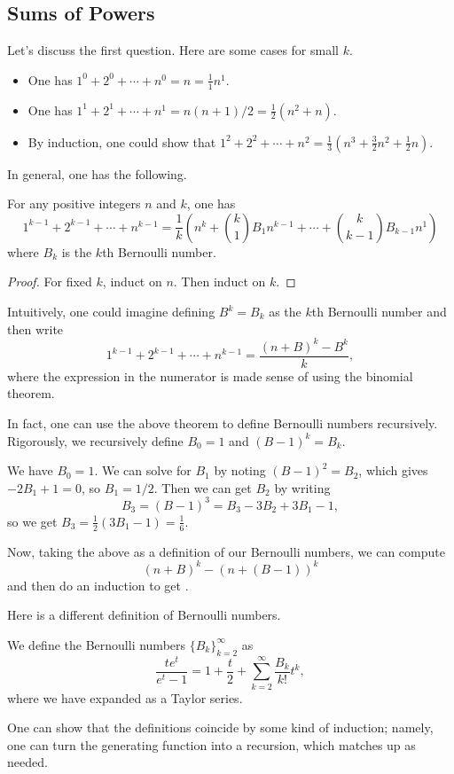 \documentclass{article}
\begin{document}
\subsection{Sums of Powers}
Let's discuss the first question. Here are some cases for small $k$.
\begin{itemize}
	\item One has $1^0+2^0+\cdots+n^0=n=\frac11n^1$.
	\item One has $1^1+2^1+\cdots+n^1=n(n+1)/2=\frac12\left(n^2+n\right)$.
	\item By induction, one could show that $1^2+2^2+\cdots+n^2=\frac13\left(n^3+\frac32n^2+\frac12n\right)$.
\end{itemize}
In general, one has the following.
\begin{theorem}[Faulhaber] \label{thm:faulhaber}
	For any positive integers $n$ and $k$, one has
	\[1^{k-1}+2^{k-1}+\cdots+n^{k-1}=\frac1k\left(n^k+\binom k1B_1n^{k-1}+\cdots+\binom k{k-1}B_{k-1}n^1\right)\]
	where $B_k$ is the $k$th Bernoulli number.
\end{theorem}
\begin{proof}
	For fixed $k$, induct on $n$. Then induct on $k$.
\end{proof}
\begin{remark}
	Intuitively, one could imagine defining $B^k=B_k$ as the $k$th Bernoulli number and then write
	\[1^{k-1}+2^{k-1}+\cdots+n^{k-1}=\frac{(n+B)^k-B^k}k,\]
	where the expression in the numerator is made sense of using the binomial theorem.
\end{remark}
In fact, one can use the above theorem to define Bernoulli numbers recursively. Rigorously, we recursively define $B_0=1$ and $(B-1)^k=B_k$.
\begin{example}
	We have $B_0=1$. We can solve for $B_1$ by noting $(B-1)^2=B_2$, which gives $-2B_1+1=0$, so $B_1=1/2$. Then we can get $B_2$ by writing
	\[B_3=(B-1)^3=B_3-3B_2+3B_1-1,\]
	so we get $B_3=\frac12\left(3B_1-1\right)=\frac16$.
\end{example}
Now, taking the above as a definition of our Bernoulli numbers, we can compute
\[(n+B)^k-(n+(B-1))^k\]
and then do an induction to get .

Here is a different definition of Bernoulli numbers.
\begin{definition}[Bernoulli]
	We define the Bernoulli numbers $\{B_k\}_{k=2}^\infty$ as
	\[\frac{te^t}{e^t-1}=1+\frac t2+\sum_{k=2}^\infty\frac{B_k}{k!}t^k,\]
	where we have expanded as a Taylor series.
\end{definition}
One can show that the definitions coincide by some kind of induction; namely, one can turn the generating function into a recursion, which matches up as needed.
\end{document}
